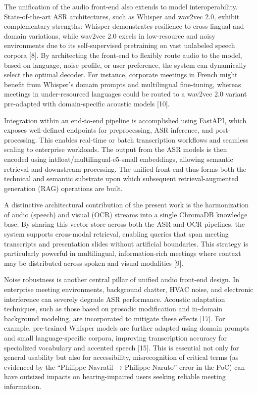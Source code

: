 \documentclass[12pt,a4paper]{article}
\begin{document}
The unification of the audio front-end also extends to model interoperability. State-of-the-art ASR architectures, such as Whisper and wav2vec 2.0, exhibit complementary strengths: Whisper demonstrates resilience to cross-lingual and domain variations, while wav2vec 2.0 excels in low-resource and noisy environments due to its self-supervised pretraining on vast unlabeled speech corpora [8]. By architecting the front-end to flexibly route audio to the model, based on language, noise profile, or user preference, the system can dynamically select the optimal decoder. For instance, corporate meetings in French might benefit from Whisper’s domain prompts and multilingual fine-tuning, whereas meetings in under-resourced languages could be routed to a wav2vec 2.0 variant pre-adapted with domain-specific acoustic models [10].


Integration within an end-to-end pipeline is accomplished using FastAPI, which exposes well-defined endpoints for preprocessing, ASR inference, and post-processing. This enables real-time or batch transcription workflows and seamless scaling to enterprise workloads. The output from the ASR models is then encoded using intfloat/multilingual-e5-small embeddings, allowing semantic retrieval and downstream processing. The unified front-end thus forms both the technical and semantic substrate upon which subsequent retrieval-augmented generation (RAG) operations are built.


A distinctive architectural contribution of the present work is the harmonization of audio (speech) and visual (OCR) streams into a single ChromaDB knowledge base. By sharing this vector store across both the ASR and OCR pipelines, the system supports cross-modal retrieval, enabling queries that span meeting transcripts and presentation slides without artificial boundaries. This strategy is particularly powerful in multilingual, information-rich meetings where context may be distributed across spoken and visual modalities [9].


Noise robustness is another central pillar of unified audio front-end design. In enterprise meeting environments, background chatter, HVAC noise, and electronic interference can severely degrade ASR performance. Acoustic adaptation techniques, such as those based on prosodic modification and in-domain background modeling, are incorporated to mitigate these effects [17]. For example, pre-trained Whisper models are further adapted using domain prompts and small language-specific corpora, improving transcription accuracy for specialized vocabulary and accented speech [15]. This is essential not only for general usability but also for accessibility, misrecognition of critical terms (as evidenced by the “Philippe Navratil → Philippe Naruto” error in the PoC) can have outsized impacts on hearing-impaired users seeking reliable meeting information.
\end{document}
